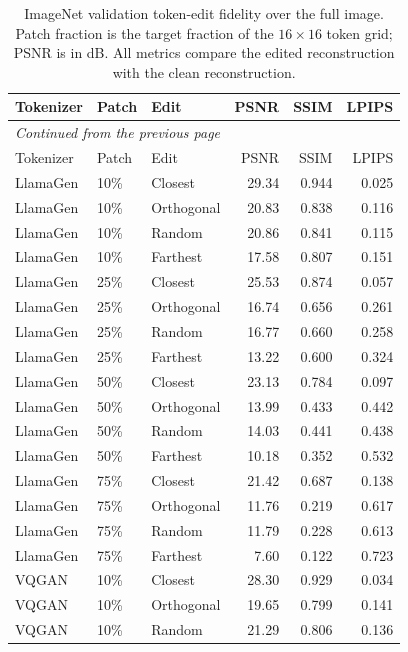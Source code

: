 \begingroup
\small
\setlength{\tabcolsep}{4pt}
\begin{longtable}{lllrrr}
\caption[ImageNet validation token-edit fidelity over the full image]{ImageNet validation token-edit fidelity over the full image. Patch fraction is the target fraction of the $16\times16$ token grid; PSNR is in dB. All metrics compare the edited reconstruction with the clean reconstruction.}\label{tab:app_imagenet_val_full_image_fidelity}\\
\hline
Tokenizer & Patch & Edit & PSNR & SSIM & LPIPS \\ \hline
\endfirsthead
\multicolumn{6}{l}{\small\itshape Continued from the previous page}\\
\hline
Tokenizer & Patch & Edit & PSNR & SSIM & LPIPS \\ \hline
\endhead
\hline
\endfoot
LlamaGen & 10\% & Closest & 29.34 & 0.944 & 0.025 \\
LlamaGen & 10\% & Orthogonal & 20.83 & 0.838 & 0.116 \\
LlamaGen & 10\% & Random & 20.86 & 0.841 & 0.115 \\
LlamaGen & 10\% & Farthest & 17.58 & 0.807 & 0.151 \\
LlamaGen & 25\% & Closest & 25.53 & 0.874 & 0.057 \\
LlamaGen & 25\% & Orthogonal & 16.74 & 0.656 & 0.261 \\
LlamaGen & 25\% & Random & 16.77 & 0.660 & 0.258 \\
LlamaGen & 25\% & Farthest & 13.22 & 0.600 & 0.324 \\
LlamaGen & 50\% & Closest & 23.13 & 0.784 & 0.097 \\
LlamaGen & 50\% & Orthogonal & 13.99 & 0.433 & 0.442 \\
LlamaGen & 50\% & Random & 14.03 & 0.441 & 0.438 \\
LlamaGen & 50\% & Farthest & 10.18 & 0.352 & 0.532 \\
LlamaGen & 75\% & Closest & 21.42 & 0.687 & 0.138 \\
LlamaGen & 75\% & Orthogonal & 11.76 & 0.219 & 0.617 \\
LlamaGen & 75\% & Random & 11.79 & 0.228 & 0.613 \\
LlamaGen & 75\% & Farthest & 7.60 & 0.122 & 0.723 \\
VQGAN & 10\% & Closest & 28.30 & 0.929 & 0.034 \\
VQGAN & 10\% & Orthogonal & 19.65 & 0.799 & 0.141 \\
VQGAN & 10\% & Random & 21.29 & 0.806 & 0.136 \\

\end{longtable}
